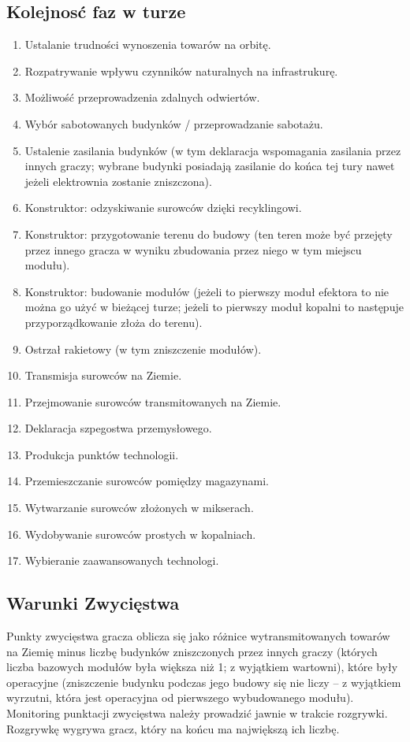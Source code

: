\documentclass[11pt,a4paper]{article}
\begin{document}
\subsection{Kolejnosć faz w turze}

\begin{enumerate}
  \setlength{\parskip}{0pt}
  \setlength{\itemsep}{0pt plus 1pt}
\item Ustalanie trudności wynoszenia towarów na orbitę.
\item Rozpatrywanie wpływu czynników naturalnych na infrastrukurę.
\item Możliwość przeprowadzenia zdalnych odwiertów.
\item Wybór sabotowanych budynków / przeprowadzanie sabotażu.
\item Ustalenie zasilania budynków (w tym deklaracja wspomagania zasilania przez innych graczy; wybrane budynki posiadają zasilanie do końca tej tury nawet jeżeli elektrownia zostanie zniszczona).
\item Konstruktor: odzyskiwanie surowców dzięki recyklingowi.
\item Konstruktor: przygotowanie terenu do budowy (ten teren może być przejęty przez innego gracza w wyniku zbudowania przez niego w tym miejscu modułu).
\item Konstruktor: budowanie modułów (jeżeli to pierwszy moduł efektora to nie można go użyć w bieżącej turze; jeżeli to pierwszy moduł kopalni to następuje przyporządkowanie złoża do terenu).
\item Ostrzał rakietowy (w tym zniszczenie modułów).
\item Transmisja surowców na Ziemie.
\item Przejmowanie surowców transmitowanych na Ziemie.
\item Deklaracja szpegostwa przemysłowego.
\item Produkcja punktów technologii.
\item Przemieszczanie surowców pomiędzy magazynami.
\item Wytwarzanie surowców złożonych w mikserach.
\item Wydobywanie surowców prostych w kopalniach.
\item Wybieranie zaawansowanych technologi.
\end{enumerate}

\subsection{Warunki Zwycięstwa}

Punkty zwycięstwa gracza oblicza się jako różnice wytransmitowanych towarów na Ziemię minus liczbę budynków zniszczonych przez innych graczy (których liczba bazowych modułów była większa niż 1; z wyjątkiem wartowni), które były operacyjne (zniszczenie budynku podczas jego budowy się nie liczy -- z wyjątkiem wyrzutni, która jest operacyjna od pierwszego wybudowanego modułu). Monitoring punktacji zwycięstwa należy prowadzić jawnie w trakcie rozgrywki. Rozgrywkę wygrywa gracz, który na końcu ma największą ich liczbę.
\end{document}
